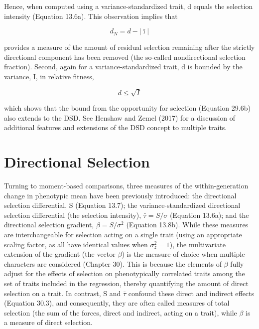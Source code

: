 \documentclass{article}
\begin{document}
Hence, when computed using a variance-standardized trait, d equals the selection intensity (Equation 13.6a). This observation implies that

\begin{equation}
d_{N}=d-\left|\bar{\imath}\right|
\tag{29.15d}
\label{eq:29_15d}
\end{equation}

provides a measure of the amount of residual selection remaining after the strictly directional component has been removed (the so-called nondirectional selection fraction). Second, again for a variance-standardized trait, d is bounded by the variance, I, in relative fitness,

\begin{equation}
d\leq\sqrt{I}
\tag{29.15e}
\label{eq:29_15e}
\end{equation}

which shows that the bound from the opportunity for selection (Equation 29.6b) also extends to the DSD. See Henshaw and Zemel (2017) for a discussion of additional features and extensions of the DSD concept to multiple traits.

\section{Directional Selection}
Turning to moment-based comparisons, three measures of the within-generation change in phenotypic mean have been previously introduced: the directional selection differential, S (Equation 13.7); the variance-standardized directional selection differential (the selection intensity),  $ \bar{\tau} = S/\sigma $ (Equation 13.6a); and the directional selection gradient,  $ \beta = S/\sigma^2 $ (Equation 13.8b). While these measures are interchangeable for selection acting on a single trait (using an appropriate scaling factor, as all have identical values when  $ \sigma_z^2 = 1 $), the multivariate extension of the gradient (the vector  $ \beta $) is the measure of choice when multiple characters are considered (Chapter 30). This is because the elements of  $ \beta $ fully adjust for the effects of selection on phenotypically correlated traits among the set of traits included in the regression, thereby quantifying the amount of direct selection on a trait. In contrast, S and  $ \bar{\tau} $ confound these direct and indirect effects (Equation 30.3), and consequently, they are often called measures of total selection (the sum of the forces, direct and indirect, acting on a trait), while  $ \beta $ is a measure of direct selection.
\end{document}
